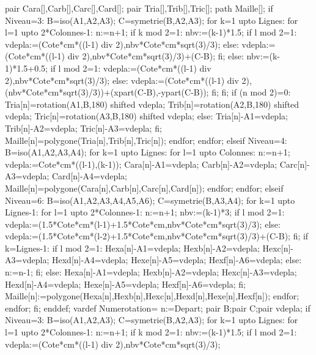 {  pair Cara[],Carb[],Carc[],Card[];
  pair Tria[],Trib[],Tric[];
  path Maille[];
  if Niveau=3:
    B=iso(A1,A2,A3);
    C=symetrie(B,A2,A3);
    for k=1 upto Lignes:
      for l=1 upto 2*Colonnes-1:
        n:=n+1;
        if k mod 2=1:
        nbv:=(k-1)*1.5;
          if l mod 2=1:
          vdepla:=(Cote*cm*((l-1) div 2),nbv*Cote*cm*sqrt(3)/3);
          else:
          vdepla:=(Cote*cm*((l-1) div 2),nbv*Cote*cm*sqrt(3)/3)+(C-B);
          fi;
          else:
          nbv:=(k-1)*1.5+0.5;
        if l mod 2=1:
        vdepla:=(Cote*cm*((l-1) div 2),nbv*Cote*cm*sqrt(3)/3);
        else:
        vdepla:=(Cote*cm*((l-1) div 2),(nbv*Cote*cm*sqrt(3)/3))+(xpart(C-B),-ypart(C-B));
        fi;
        fi;
        if (n mod 2)=0:
        Tria[n]=rotation(A1,B,180) shifted vdepla;
        Trib[n]=rotation(A2,B,180) shifted vdepla;
        Tric[n]=rotation(A3,B,180) shifted vdepla;
        else:
        Tria[n]-A1=vdepla;
        Trib[n]-A2=vdepla;
        Tric[n]-A3=vdepla;
        fi;
        Maille[n]=polygone(Tria[n],Trib[n],Tric[n]);
  endfor;
  endfor;
  elseif Niveau=4:
  B=iso(A1,A2,A3,A4);
  for k=1 upto Lignes:
  for l=1 upto Colonnes:
  n:=n+1;
  vdepla:=Cote*cm*((l-1),(k-1));
  Cara[n]-A1=vdepla;
  Carb[n]-A2=vdepla;
  Carc[n]-A3=vdepla;
  Card[n]-A4=vdepla;
  Maille[n]=polygone(Cara[n],Carb[n],Carc[n],Card[n]);
  endfor;
  endfor;
  elseif Niveau=6:
  B=iso(A1,A2,A3,A4,A5,A6);
  C=symetrie(B,A3,A4);
    for k=1 upto Lignes-1:
      for l=1 upto 2*Colonnes-1:
        n:=n+1;
        nbv:=(k-1)*3;
        if l mod 2=1:
          vdepla:=(1.5*Cote*cm*(l-1)+1.5*Cote*cm,nbv*Cote*cm*sqrt(3)/3);
        else:
          vdepla:=(1.5*Cote*cm*(l-2)+1.5*Cote*cm,nbv*Cote*cm*sqrt(3)/3)+(C-B);
        fi;
        if k=Lignes-1:
        if l mod 2=1:
        Hexa[n]-A1=vdepla;
        Hexb[n]-A2=vdepla;
        Hexc[n]-A3=vdepla;
        Hexd[n]-A4=vdepla;
        Hexe[n]-A5=vdepla;
        Hexf[n]-A6=vdepla;
        else:
        n:=n-1;
        fi;
        else:
        Hexa[n]-A1=vdepla;
        Hexb[n]-A2=vdepla;
        Hexc[n]-A3=vdepla;
        Hexd[n]-A4=vdepla;
        Hexe[n]-A5=vdepla;
        Hexf[n]-A6=vdepla;
        fi;
        Maille[n]:=polygone(Hexa[n],Hexb[n],Hexc[n],Hexd[n],Hexe[n],Hexf[n]);
      endfor;
    endfor;
  fi;
  enddef;
  vardef Numerotation=
  n:=Depart;
  pair B;pair C;pair vdepla;
  if Niveau=3:
    B=iso(A1,A2,A3);
    C=symetrie(B,A2,A3);
    for k=1 upto Lignes:
      for l=1 upto 2*Colonnes-1:
        n:=n+1;
        if k mod 2=1:
        nbv:=(k-1)*1.5;
          if l mod 2=1:
          vdepla:=(Cote*cm*((l-1) div 2),nbv*Cote*cm*sqrt(3)/3);
}
